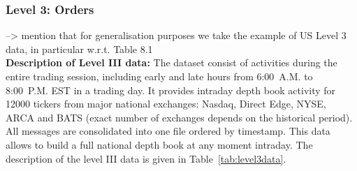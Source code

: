 \subsubsection{Level 3: Orders}

--> mention that for generalisation purposes we take the example of US Level 3 data, in particular w.r.t. Table 8.1  \\

\noindent\textbf{Description of Level III data:} The dataset consist of activities during the entire trading session, including early and late hours from 6:00~A.M. to 8:00~P.M. EST in a trading day. It provides intraday depth book activity for 12000 tickers from major national exchanges: Nasdaq, Direct Edge, NYSE, ARCA and BATS (exact number of exchanges depends on the historical period). All messages are consolidated into one file ordered by timestamp. This data allows to build a full national depth book at any moment intraday. The description of the level III data is given in Table~\ref{tab:level3data}. \\
